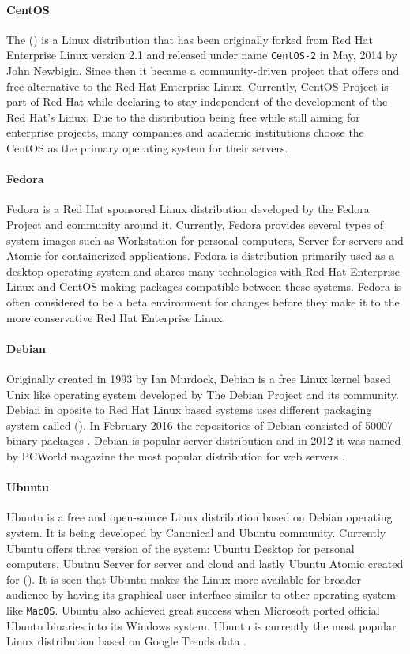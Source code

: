 \paragraph{CentOS}
The  () is a Linux distribution that has been originally forked from Red Hat Enterprise Linux version 2.1 and released under name \texttt{CentOS-2} in May, 2014 \cite{centosfirsts} by John Newbigin. Since then it became a community-driven project that offers and free alternative to the Red Hat Enterprise Linux. Currently, CentOS Project is part of Red Hat while declaring to stay independent of the development of the Red Hat's Linux. Due to the distribution being free while still aiming for enterprise projects, many companies and academic institutions choose the CentOS as the primary operating system for their servers.
\paragraph{Fedora}
Fedora is a Red Hat sponsored Linux distribution developed by the Fedora Project and community around it. Currently, Fedora provides several types of system images such as Workstation for personal computers, Server for servers and Atomic for containerized applications. Fedora is distribution primarily used as a desktop operating system and shares many technologies with Red Hat Enterprise Linux and CentOS making packages compatible between these systems. Fedora is often considered to be a beta environment for changes before they make it to the more conservative Red Hat Enterprise Linux.
\paragraph{Debian}
Originally created in 1993 by Ian Murdock, Debian is a free Linux kernel based Unix like operating system developed by The Debian Project and its community. Debian in oposite to Red Hat Linux based systems uses different packaging system called  (). In February 2016 the repositories of Debian consisted of 50007 binary packages \cite{debianfifty}. Debian is popular server distribution and in 2012 it was named by PCWorld magazine the most popular distribution for web servers \cite{debianpopular}.
\paragraph{Ubuntu}
Ubuntu is a free and open-source Linux distribution based on Debian operating system. It is being developed by 	Canonical and Ubuntu community. Currently Ubuntu offers three version of the system: Ubuntu Desktop for personal computers, Ubutnu Server for server and cloud and lastly Ubuntu Atomic created for  (). It is seen that Ubuntu makes the Linux more available for broader audience by having its graphical user interface similar to other operating system like \texttt{MacOS}. Ubuntu also achieved great success when Microsoft ported official Ubuntu binaries into its Windows system. Ubuntu is currently the most popular Linux distribution based on Google Trends data \cite{linuxtrends}.
